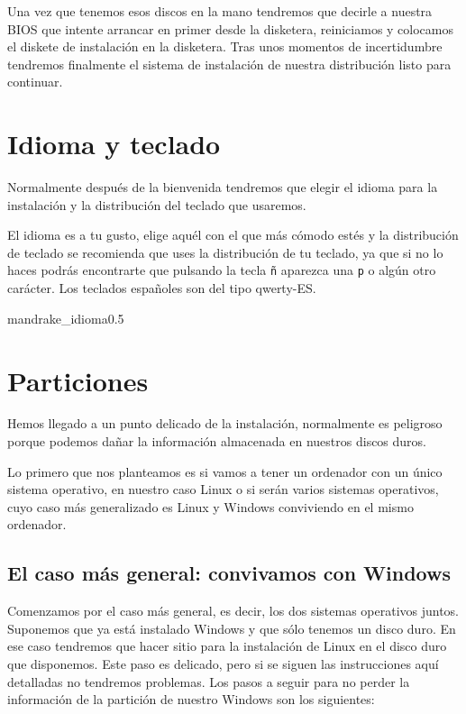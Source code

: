 Una  vez  que  tenemos  esos discos en la mano tendremos que decirle a
nuestra  BIOS  que  intente  arrancar  en primer desde la disketera, 
reiniciamos y colocamos el diskete de instalación en  la  disketera.
Tras unos momentos de incertidumbre tendremos finalmente el sistema de
instalación de nuestra distribución listo para continuar.

\section{Idioma y teclado}

Normalmente después  de la bienvenida  tendremos que elegir  el idioma
para la instalación y la distribución del teclado que usaremos.

El idioma es a tu gusto, elige aquél  con el que más cómodo estés y la
distribución de teclado  se recomienda que uses la  distribución de tu
teclado, ya  que si  no lo  haces podrás  encontrarte que  pulsando la
tecla  \verb.ñ.  aparezca una  \verb.p.  o  algún otro  carácter.  Los
teclados españoles son del tipo qwerty-ES.

\begin{figura}{mandrake_idioma}{0.5}
\caption{Selección del idioma}
\end{figura}

\section{Particiones}

Hemos llegado  a un punto  delicado de la instalación,  normalmente es
peligroso porque  podemos dañar la información  almacenada en nuestros
discos duros.

Lo primero que nos planteamos es si  vamos a tener un ordenador con un
único  sistema operativo,  en nuestro  caso  Linux o  si serán  varios
sistemas operativos,  cuyo caso  más generalizado  es Linux  y Windows
conviviendo en el mismo ordenador.


\subsection{El caso más general: convivamos con Windows}

Comenzamos  por  el caso  más  general,  es  decir, los  dos  sistemas
operativos juntos. Suponemos que ya  está instalado Windows y que sólo
tenemos un disco  duro. En ese caso tendremos que  hacer sitio para la
instalación de  Linux en el  disco duro  que disponemos. Este  paso es
delicado, pero  si se  siguen las instrucciones aquí detalladas  no tendremos
problemas. Los  pasos a  seguir para  no perder  la información  de la
partición de nuestro Windows son los siguientes:

